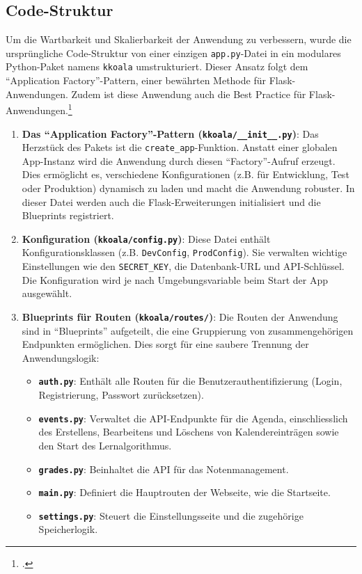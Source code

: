 \documentclass[12pt,a4paper]{report}
\begin{document}
\subsection{Code-Struktur}
Um die Wartbarkeit und Skalierbarkeit der Anwendung zu verbessern, wurde die ursprüngliche Code-Struktur von einer einzigen \texttt{app.py}-Datei in ein modulares Python-Paket namens \texttt{kkoala} umstrukturiert. Dieser Ansatz folgt dem \enquote{Application Factory}-Pattern, einer bewährten Methode für Flask-Anwendungen. Zudem ist diese Anwendung auch die Best Practice für Flask-Anwendungen.\footcite{flask_structure_best_practices}

\begin{enumerate}
    \item \textbf{Das \enquote{Application Factory}-Pattern (\texttt{kkoala/\_\_init\_\_.py})}:
    Das Herzstück des Pakets ist die \texttt{create\_app}-Funktion. Anstatt einer globalen App-Instanz wird die Anwendung durch diesen \enquote{Factory}-Aufruf erzeugt. Dies ermöglicht es, verschiedene Konfigurationen (z.B. für Entwicklung, Test oder Produktion) dynamisch zu laden und macht die Anwendung robuster. In dieser Datei werden auch die Flask-Erweiterungen initialisiert und die Blueprints registriert.

    \item \textbf{Konfiguration (\texttt{kkoala/config.py})}:
    Diese Datei enthält Konfigurationsklassen (z.B. \texttt{DevConfig}, \texttt{ProdConfig}). Sie verwalten wichtige Einstellungen wie den \texttt{SECRET\_KEY}, die Datenbank-URL und API-Schlüssel. Die Konfiguration wird je nach Umgebungsvariable beim Start der App ausgewählt.

    \item \textbf{Blueprints für Routen (\texttt{kkoala/routes/})}:
    Die Routen der Anwendung sind in \enquote{Blueprints} aufgeteilt, die eine Gruppierung von zusammengehörigen Endpunkten ermöglichen. Dies sorgt für eine saubere Trennung der Anwendungslogik:
    \begin{itemize}
        \item \textbf{\texttt{auth.py}}: Enthält alle Routen für die Benutzerauthentifizierung (Login, Registrierung, Passwort zurücksetzen).
        \item \textbf{\texttt{events.py}}: Verwaltet die API-Endpunkte für die Agenda, einschliesslich des Erstellens, Bearbeitens und Löschens von Kalendereinträgen sowie den Start des Lernalgorithmus.
        \item \textbf{\texttt{grades.py}}: Beinhaltet die API für das Notenmanagement.
        \item \textbf{\texttt{main.py}}: Definiert die Hauptrouten der Webseite, wie die Startseite.
        \item \textbf{\texttt{settings.py}}: Steuert die Einstellungsseite und die zugehörige Speicherlogik.
    \end{itemize}


\end{enumerate}
\end{document}
